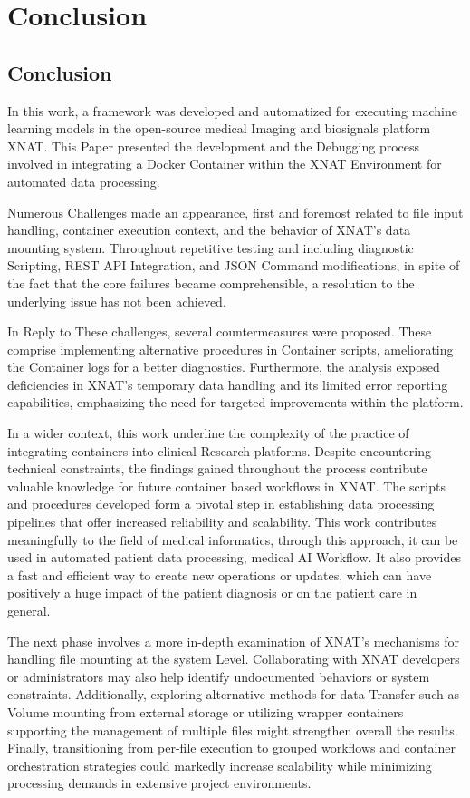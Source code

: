 \chapter{Conclusion}


\section{Conclusion}
In this work, a framework was developed and automatized for executing machine learning models in the open-source medical Imaging and biosignals platform XNAT. This Paper presented the development and the Debugging process involved in integrating a Docker Container within the XNAT Environment for automated data processing.

Numerous Challenges made an appearance, first and foremost related to file input handling, container execution context, and the behavior of XNAT's data mounting system. Throughout repetitive testing and including diagnostic Scripting, REST API Integration, and JSON Command modifications, in spite of the fact that the core failures became comprehensible, a resolution to the underlying issue has not been achieved.


In Reply to These challenges, several countermeasures were proposed. These comprise implementing alternative procedures in Container scripts, ameliorating the Container logs for a better diagnostics. Furthermore, the analysis exposed deficiencies in XNAT’s temporary data handling and its limited error reporting capabilities, emphasizing the need for targeted improvements within the platform.

In a wider context, this work underline the complexity of the practice of integrating containers into clinical Research platforms.
Despite encountering technical constraints, the findings gained throughout the process
contribute valuable knowledge for future container based workflows in XNAT. The scripts and procedures developed form a pivotal step in establishing data processing pipelines that offer increased reliability and scalability. This work contributes meaningfully to the field of medical informatics, through this approach, it can be used in automated patient data processing, medical AI Workflow. It also provides a fast and efficient way to create new operations or updates, which can have positively a huge impact of the patient diagnosis or on the patient care in general.

The next phase involves a more in-depth examination of XNAT's mechanisms for handling file mounting at the system Level. Collaborating with XNAT developers or administrators may also help identify undocumented behaviors or system constraints. Additionally, exploring alternative methods for data Transfer such as Volume mounting from external storage or utilizing wrapper containers supporting the management of multiple files  might strengthen overall the results. Finally, transitioning from per-file execution to grouped workflows and container orchestration strategies could markedly increase scalability while minimizing processing demands in extensive project environments.


